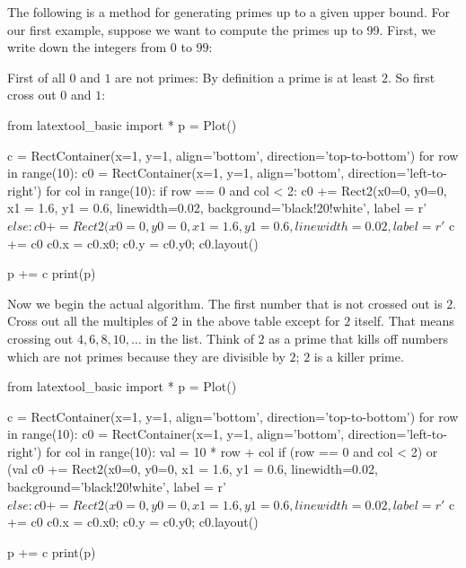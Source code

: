 The following is a method for generating primes up to a given upper bound.
For our first example, suppose we want to compute the primes up to 99.
First, we write down the integers from $0$ to $99$:


First of all $0$ and $1$ are not primes: By definition a prime is at least
$2$. So first cross out $0$ and $1$:

\begin{python}
from latextool_basic import *
p = Plot()

c = RectContainer(x=1, y=1, align='bottom', direction='top-to-bottom')
for row in range(10):
    c0 = RectContainer(x=1, y=1, align='bottom', direction='left-to-right')
    for col in range(10):
        if row == 0 and col < 2:
            c0 += Rect2(x0=0, y0=0, x1 = 1.6, y1 = 0.6, linewidth=0.02,
                        background='black!20!white', 
                        label = r'$%
        else:
            c0 += Rect2(x0=0, y0=0, x1 = 1.6, y1 = 0.6, linewidth=0.02, 
                        label = r'$%
    c += c0
    c0.x = c0.x0; c0.y = c0.y0; c0.layout()

p += c
print(p)
\end{python}

Now we begin the actual algorithm. The first number that is not crossed
out is $2$. Cross out all the multiples of $2$ in the above table except
for $2$ itself. That means crossing out $4, 6, 8, 10, \dots$ in the list.
Think of $2$ as a prime that kills off numbers which are not primes because
they are divisible by $2$; $2$ is a killer prime.

\begin{python}
from latextool_basic import *
p = Plot()

c = RectContainer(x=1, y=1, align='bottom', direction='top-to-bottom')
for row in range(10):
    c0 = RectContainer(x=1, y=1, align='bottom', direction='left-to-right')
    for col in range(10):
        val = 10 * row + col
        if (row == 0 and col < 2) or (val %
            c0 += Rect2(x0=0, y0=0, x1 = 1.6, y1 = 0.6, linewidth=0.02,
                        background='black!20!white', 
                        label = r'$%
        else:
            c0 += Rect2(x0=0, y0=0, x1 = 1.6, y1 = 0.6, linewidth=0.02, 
                        label = r'$%
    c += c0
    c0.x = c0.x0; c0.y = c0.y0; c0.layout()

p += c
print(p)
\end{python}

